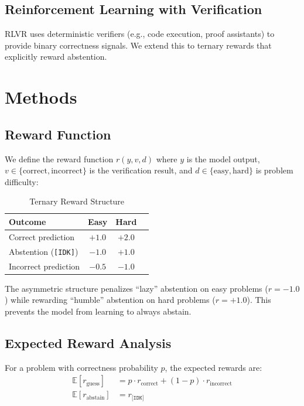 \documentclass{article}
\begin{document}
\subsection{Reinforcement Learning with Verification}
RLVR \cite[Section 2]{DeepSeekR12024} uses deterministic verifiers (e.g., code execution, proof assistants) to provide binary correctness signals. We extend this to ternary rewards that explicitly reward abstention.

\section{Methods}

\subsection{Reward Function}
We define the reward function $r(y, v, d)$ where $y$ is the model output, $v \in \{\text{correct}, \text{incorrect}\}$ is the verification result, and $d \in \{\text{easy}, \text{hard}\}$ is problem difficulty:

\begin{table}[h]
\centering
\caption{Ternary Reward Structure}
\label{tab:rewards}
\begin{tabular}{@{}lccc@{}}
\toprule
\textbf{Outcome} & \textbf{Easy} & \textbf{Hard} \\
\midrule
Correct prediction & $+1.0$ & $+2.0$ \\
Abstention (\texttt{[IDK]}) & $-1.0$ & $+1.0$ \\
Incorrect prediction & $-0.5$ & $-1.0$ \\
\bottomrule
\end{tabular}
\end{table}

The asymmetric structure penalizes ``lazy'' abstention on easy problems ($r=-1.0$) while rewarding ``humble'' abstention on hard problems ($r=+1.0$). This prevents the model from learning to always abstain.

\subsection{Expected Reward Analysis}
For a problem with correctness probability $p$, the expected rewards are:
\begin{align}
    \mathbb{E}[r_{\text{guess}}] &= p \cdot r_{\text{correct}} + (1-p) \cdot r_{\text{incorrect}} \\
    \mathbb{E}[r_{\text{abstain}}] &= r_{\texttt{[IDK]}}
\end{align}
\end{document}
